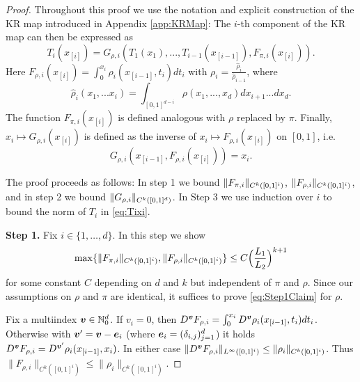 \begin{proof}
Throughout this proof we use the notation and explicit
    construction of the KR map introduced in Appendix \ref{app:KRMap}: The
    $i$-th component of the KR map can then be expressed as
    \begin{equation}\label{eq:Tixi}
      T_i(x_{[i]}) = G_{\rho, i}(T_1(x_1), ..., T_{i-1}(x_{[i-1]}), F_{\pi,
        i}(x_{[i]})).
    \end{equation}
    Here
    $F_{\rho, i}(x_{[i]})= \int_{0}^{x_i} \rho_i(x_{[i-1]}, t_i)dt_i$
    with $\rho_i = \frac{\hat{\rho}_i}{\hat{\rho}_{i-1}}$, where
    \begin{equation}\label{eq:hatrhoi}
      \hat{\rho}_i(x_1,...x_i) =
      \int_{[0,1]^{d-i}}\rho(x_1,...,x_d)dx_{i+1}...dx_d.
    \end{equation}
    The function $F_{\pi, i}(x_{[i]})$ is defined analogous with
    $\rho$ replaced by $\pi$.  Finally,
    $x_i\mapsto G_{\rho, i}(x_{[i]})$ is defined as the inverse of
    $x_i\mapsto F_{\rho, i}(x_{[i]})$ on $[0,1]$, i.e.
    \begin{equation}\label{eq:Grhoidef}
      G_{\rho,i}(x_{[i-1]},F_{\rho,i}(x_{[i]}))=x_i.
    \end{equation}


    The proof proceeds as follows: In step 1 we bound
    $\|F_{\pi,i}\|_{C^k([0,1]^i)}$, $\|F_{\rho,i}\|_{C^k([0,1]^i)}$, and in
    step 2 we bound $\|G_{\rho,i}\|_{C^k([0,1]^d)}$. In Step 3 we use
    induction over $i$ to bound the norm of $T_i$ in \eqref{eq:Tixi}.

    {\bf Step 1.} Fix $i\in\{1,\dots,d\}$. In this step we show
    \begin{equation}\label{eq:Step1Claim}
      \max\{\|F_{\pi,i}\|_{C^k([0,1]^i)},\|F_{\rho,i}\|_{C^k([0,1]^i)}\}\le C
      \Big(\frac{L_1}{L_2}\Big)^{k+1}
    \end{equation}
    for some constant $C$ depending on $d$ and $k$ but independent of
    $\pi$ and $\rho$. Since our assumptions on $\rho$ and $\pi$ are
    identical, it suffices to prove \eqref{eq:Step1Claim} for $\rho$.

  Fix a multiindex ${\boldsymbol v}\in\mathbb{N}_0^d$. If $v_i=0$, then $D^{\boldsymbol v} F_{\rho,
    i} = \int_0^{x_i}D^{\boldsymbol v} \rho_i(x_{[i-1]},
  t_i)dt_i$.  Otherwise with ${\boldsymbol v}' = {\boldsymbol v} -
  {\boldsymbol e}_i$ (where ${\boldsymbol e}_i=(\delta_{i,j})_{j=1}^d$) it holds $D^{\boldsymbol v}
  F_{\rho, i} = D^{{\boldsymbol v}'} \rho_i(x_{[i-1]},
  x_i)$. In either case $\|D^{\boldsymbol v} F_{\rho, i}\|_{L^\infty([0,1]^i)}
  \leq \|\rho_i\|_{C^k([0,1]^i)}$. Thus $\|F_{\rho,
    i}\|_{C^k([0,1]^i)} \leq \|\rho_i\|_{C^k([0,1]^i)}$.


\end{proof}
